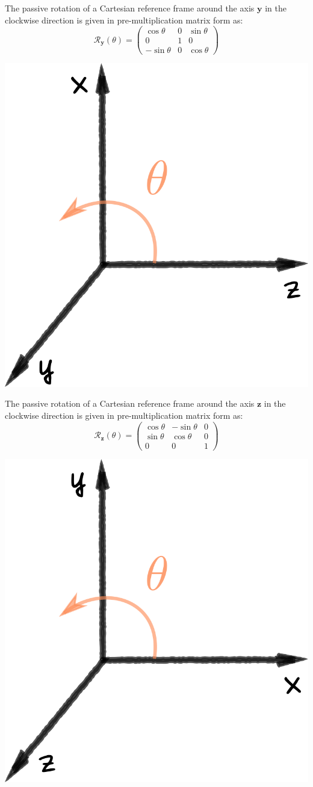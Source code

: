 \noindent\begin{minipage}{0.47\textwidth}
The passive rotation of a Cartesian reference frame around the axis $\mathbf{y}$ in the clockwise direction is given in pre-multiplication matrix form as: 
\begin{equation*}
\mathcal{R}_\mathbf{y}(\theta)=\begin{pmatrix}
\cos{\theta}  &  0     & \sin{\theta} \\
0             & 1      & 0 \\
-\sin{\theta} & 0      & \cos{\theta}
\end{pmatrix}
\end{equation*}
\end{minipage}
\begin{minipage}{0.5\textwidth}
\centering
\includegraphics[width=0.45\linewidth]{Figures/Ry.png}
\end{minipage}

\vspace{.3cm}

\noindent\begin{minipage}{0.47\textwidth}
The passive rotation of a Cartesian reference frame around the axis $\mathbf{z}$ in the clockwise direction is given in pre-multiplication matrix form as: 
\begin{equation*}
\mathcal{R}_\mathbf{z}(\theta)=\begin{pmatrix}
\cos{\theta} & -\sin{\theta} & 0 \\
\sin{\theta} & \cos{\theta}  & 0 \\
0            &  0            & 1
\end{pmatrix}
\end{equation*}
\end{minipage}%
\begin{minipage}{0.5\textwidth}
\centering
\includegraphics[width=0.45\linewidth]{Figures/Rz.png}
\end{minipage}

\vspace{.3cm}